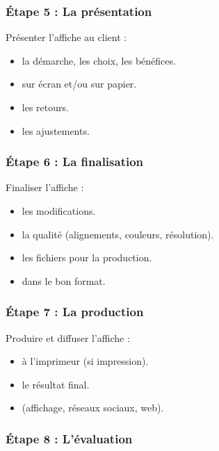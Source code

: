\subsubsection{Étape 5 : La présentation}

Présenter l'affiche au client :

\begin{itemize}
    \item {} la démarche, les choix, les bénéfices.
    \item {} sur écran et/ou sur papier.
    \item {} les retours.
    \item {} les ajustements.
\end{itemize}

\subsubsection{Étape 6 : La finalisation}

Finaliser l'affiche :

\begin{itemize}
    \item {} les modifications.
    \item {} la qualité (alignements, couleurs, résolution).
    \item {} les fichiers pour la production.
    \item {} dans le bon format.
\end{itemize}

\subsubsection{Étape 7 : La production}

Produire et diffuser l'affiche :

\begin{itemize}
    \item {} à l'imprimeur (si impression).
    \item {} le résultat final.
    \item {} (affichage, réseaux sociaux, web).
\end{itemize}

\subsubsection{Étape 8 : L'évaluation}

